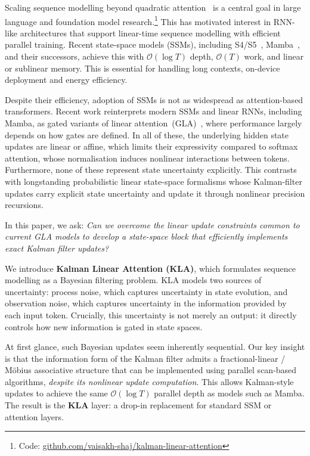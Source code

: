 \documentclass{article}
\newcommand{\our}{\textsc{KLA}\xspace}
\begin{document}
Scaling sequence modelling beyond quadratic attention~\citep{vaswani2017attention} is a central goal in large language and foundation model research.\footnote{Code: \href{https://github.com/vaisakh-shaj/kalman-linear-attention}{github.com/vaisakh-shaj/\allowbreak kalman-linear-attention}}
This has motivated interest in RNN-like architectures that support linear-time sequence modelling with efficient parallel training.
Recent state-space models (SSMs), including S4/S5~\citep{gu2021efficiently,smith2022simplified}, Mamba~\citep{gu2023mamba,dao2024transformers}, and their successors, 
achieve this with $\mathcal{O}(\log T)$ depth, $\mathcal{O}(T)$ work, and linear or sublinear memory. 
This is essential for handling long contexts, on-device deployment and energy efficiency.

Despite their efficiency, adoption of SSMs is not as widespread as attention-based transformers.
Recent work reinterprets modern SSMs and linear RNNs, including Mamba, as gated variants of linear attention~(GLA)~\citep{yang2023gated}, where performance largely depends on how gates are defined. In all of these, the underlying hidden state updates are linear or affine, which limits their expressivity compared to softmax attention, whose normalisation induces nonlinear interactions between tokens.
Furthermore, none of these represent state uncertainty explicitly. This contrasts with longstanding probabilistic linear state-space formalisms whose Kalman-filter updates carry explicit state uncertainty and update it through nonlinear precision recursions.

In this paper, we ask: {\em Can we overcome the linear update constraints common to current GLA models to develop a state-space block that efficiently implements exact Kalman filter updates?}

We introduce \textbf{Kalman Linear Attention (\our)}, which formulates sequence modelling as a Bayesian filtering problem. \our models two sources of uncertainty: process noise, which captures uncertainty in state evolution, and observation noise, which captures uncertainty in the information provided by each input token.
Crucially, this uncertainty is not merely an output: it directly controls how new information is gated in state spaces.

At first glance, such Bayesian updates seem inherently sequential. Our key insight is that the information form of the Kalman filter admits a fractional-linear / M\"obius associative structure that can be implemented using parallel scan-based algorithms, \emph{despite its nonlinear update computation}.
This allows Kalman-style updates to achieve the same $\mathcal{O}(\log T)$ parallel depth as models such as Mamba. The result is the \textbf{\our} layer: a drop-in replacement for standard SSM or attention layers.
\end{document}
